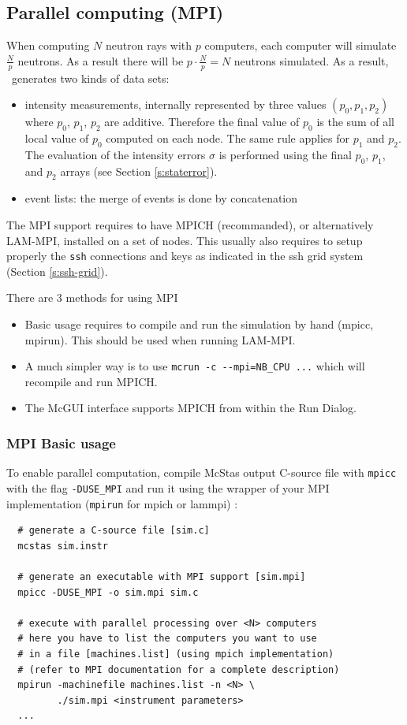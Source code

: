 \subsection{Parallel computing (MPI)}

When computing $N$ neutron rays with
$p$ computers, each computer will simulate $\frac{N}{p}$
neutrons. As a result there will be $p \cdot \frac{N}{p} = N$
neutrons simulated. As a result, \MCS\ generates two kinds of data sets:
\begin{itemize}
\item intensity measurements, internally represented by three
  values $(p_0, p_1, p_2)$ where $p_0$, $p_1$, $p_2$ are
  additive. Therefore the final value of $p_0$ is the sum of all
  local value of  $p_0$ computed on each node. The same rule applies
  for $p_1$ and $p_2$. The evaluation of the intensity errors $\sigma$
  is performed using the final $p_0$, $p_1$, and $p_2$ arrays (see Section \ref{s:staterror}).
\item event lists: the merge of events is done by concatenation
\end{itemize}
The MPI support requires to have MPICH (recommanded), or alternatively LAM-MPI, installed on a set of nodes.
This usually also requires to setup properly the \texttt{ssh} connections and keys as indicated in the ssh grid system (Section \ref{s:ssh-grid}).

There are 3 methods for using MPI
\begin{itemize}
\item Basic usage requires to compile and run the simulation by hand (mpicc, mpirun). This should be used when running LAM-MPI.
\item A much simpler way is to use \verb+mcrun -c --mpi=NB_CPU ...+ which will recompile and run MPICH.
\item The McGUI interface supports MPICH from within the Run Dialog.
\end{itemize}

\subsubsection{MPI Basic usage}

To enable parallel computation, compile McStas output C-source file
with \verb'mpicc' with the flag \verb'-DUSE_MPI' and run it using the
wrapper of your MPI implementation (\verb'mpirun' for mpich or lammpi) :
\begin{verbatim}
  # generate a C-source file [sim.c]
  mcstas sim.instr

  # generate an executable with MPI support [sim.mpi]
  mpicc -DUSE_MPI -o sim.mpi sim.c

  # execute with parallel processing over <N> computers
  # here you have to list the computers you want to use
  # in a file [machines.list] (using mpich implementation)
  # (refer to MPI documentation for a complete description)
  mpirun -machinefile machines.list -n <N> \
         ./sim.mpi <instrument parameters>
  ...
\end{verbatim}

